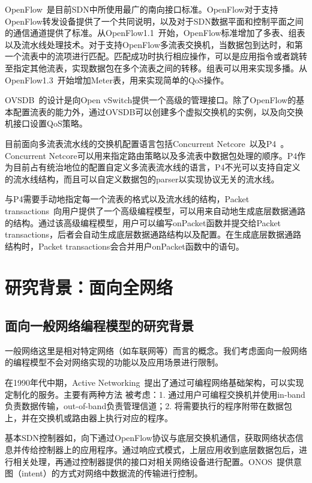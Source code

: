 OpenFlow~\cite{mckeown2008openflow}是目前SDN中所使用最广的南向接口标准。OpenFlow对于支持OpenFlow转发设备提供了一个共同说明，以及对于SDN数据平面和控制平面之间的通信通道提供了标准。从OpenFlow1.1~\cite{openflow1-1}开始，OpenFlow标准增加了多表、组表以及流水线处理技术。对于支持OpenFlow多流表交换机，当数据包到达时，和第一个流表中的流项进行匹配。匹配成功时执行相应操作，可以是应用指令或者跳转至指定其他流表，实现数据包在多个流表之间的转移。组表可以用来实现多播。从OpenFlow1.3~\cite{openflow1-3}开始增加Meter表，用来实现简单的QoS操作。

OVSDB~\cite{pfaff2013open}的设计是向Open vSwitch提供一个高级的管理接口。除了OpenFlow的基本配置流表的能力外，通过OVSDB可以创建多个虚拟交换机的实例，以及向交换机接口设置QoS策略。

目前面向多流表流水线的交换机配置语言包括Concurrent Netcore~\cite{schlesinger2014concurrent}以及P4~\cite{P4}。Concurrent Netcore可以用来指定路由策略以及多流表中数据包处理的顺序。P4作为目前占有统治地位的配置自定义多流表流水线的语言，P4不光可以支持自定义的流水线结构，而且可以自定义数据包的parser以实现协议无关的流水线。


与P4需要手动地指定每一个流表的格式以及流水线的结构，Packet transactions~\cite{sivaraman2016packet}向用户提供了一个高级编程模型，可以用来自动地生成底层数据通路的结构。通过该高级编程模型，用户可以编写onPacket函数并提交给Packet transactions，后者会自动生成底层数据通路结构以及配置。在生成底层数据通路结构时，Packet transactions会合并用户onPacket函数中的语句。


\section{研究背景：面向全网络}


\subsection{面向一般网络编程模型的研究背景}


一般网络这里是相对特定网络（如车联网等）而言的概念。我们考虑面向一般网络的编程模型不会对网络实现的功能以及应用场景进行限制。

在1990年代中期，Active Networking~\cite{tennenhouse1997survey,tennenhouse1996towards}提出了通过可编程网络基础架构，可以实现定制化的服务。主要有两种方法
被考虑：1. 通过用户可编程交换机并使用in-band负责数据传输，out-of-band负责管理信道；2. 将需要执行的程序附带在数据包上，并在交换机或路由器上执行对应的程序。

基本SDN控制器如\cite{gude2008nox,erickson2013beacon,medved2014opendaylight,shalimov2013advanced}，向下通过OpenFlow协议与底层交换机通信，获取网络状态信息并传给控制器上的应用程序。通过响应式模式，上层应用收到底层数据包后，进行相关处理，再通过控制器提供的接口对相关网络设备进行配置。ONOS~\cite{berde2014onos}提供意图（intent）的方式对网络中数据流的传输进行控制。

